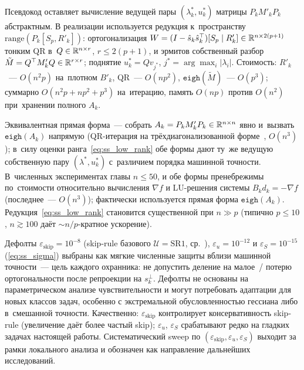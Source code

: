 \begin{remark}\label{rem:ss_u_cost}
Псевдокод оставляет вычисление ведущей пары $(\lambda_k^*,u_k^*)$
матрицы $P_k M'_k P_k$ абстрактным. В реализации используется редукция
к~пространству $\mathrm{range}(P_k[S_p,R'_k])$: ортогонализация
$W = (I-\hat s_k\hat s_k^\top)[S_p\mid R'_k]\in\mathbb{R}^{n\times 2(p{+}1)}$
тонким QR в~$Q\in\mathbb{R}^{n\times r}$, $r\le 2(p+1)$, и эрмитов
собственный разбор $\tilde M = Q^\top M'_k Q\in\mathbb{R}^{r\times r}$;
поднятие $u_k^* = Q v_{j^*}$, $j^*=\arg\max_i|\lambda_i|$. Стоимость:
$R'_k$~--- $O(n^2 p)$ на~плотном $B'_k$, QR~--- $O(np^2)$, $\mathtt{eigh}(\tilde M)$~---
$O(p^3)$; суммарно $O(n^2 p + np^2 + p^3)$ на~итерацию, память $O(np)$
против $O(n^2)$ при~хранении полного $A_k$.

Эквивалентная прямая форма~--- собрать $A_k=P_k M'_k P_k\in\mathbb{R}^{n\times n}$
явно и~вызвать $\mathtt{eigh}(A_k)$ напрямую (QR-итерация на
трёхдиагонализованной форме~\cite[\S 8.3]{golub2013}, $O(n^3)$); в~силу
оценки ранга~\eqref{eq:ss_low_rank} обе формы дают ту~же ведущую
собственную пару $(\lambda^*,u_k^*)$ с~различием порядка машинной
точности. В~численных экспериментах главы $n\le 50$, и обе формы
пренебрежимы по~стоимости относительно вычисления $\nabla f$ и
LU-решения системы $B_k d_k=-\nabla f$ (последнее~--- $O(n^3)$);
фактически используется прямая форма $\mathtt{eigh}(A_k)$.
Редукция~\eqref{eq:ss_low_rank} становится существенной при $n\gg p$
(типично $p\le 10$, $n\gtrsim 100$ даёт $\sim n/p$-кратное ускорение).
\end{remark}

\begin{remark}\label{rem:ss_u_safeguards}
Дефолты $\varepsilon_{\mathrm{skip}}=10^{-8}$ (skip-rule базового
$\mathcal{U}=\mathrm{SR1}$, ср.\ \cite[\S 6.2]{bfgs}), $\varepsilon_u=10^{-12}$
и $\varepsilon_S=10^{-15}$ (\eqref{eq:ss_sigma}) выбраны как мягкие
численные защиты вблизи машинной точности~--- цель каждого охранника:
не допустить деление на малое~/ потерю ортогональности после репроекции
на $s_k^\perp$. Дефолты не основаны на параметрическом анализе
чувствительности и могут потребовать адаптации для новых классов задач,
особенно с экстремальной обусловленностью гессиана либо в~смешанной
точности. Качественно: $\varepsilon_{\mathrm{skip}}$ контролирует
консервативность skip-rule (увеличение даёт более частый skip); $\varepsilon_u$,
$\varepsilon_S$ срабатывают редко на гладких задачах настоящей работы.
Систематический sweep по $(\varepsilon_{\mathrm{skip}},\varepsilon_u,\varepsilon_S)$
выходит за рамки локального анализа и обозначен как направление
дальнейших исследований.
\end{remark}



